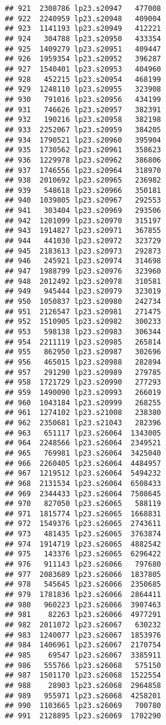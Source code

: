 \documentclass[
]{article}
\begin{document}
\begin{verbatim}
## 921  2308786 lp23.s20947   477008
## 922  2240959 lp23.s20948   409004
## 923  1141193 lp23.s20949   412221
## 924   304788 lp23.s20950   433354
## 925  1409279 lp23.s20951   409447
## 926  1959354 lp23.s20952   396287
## 927  1540401 lp23.s20953   404960
## 928   452215 lp23.s20954   468199
## 929  1248110 lp23.s20955   323908
## 930   791016 lp23.s20956   434199
## 931   746626 lp23.s20957   382391
## 932   190216 lp23.s20958   382198
## 933  2252067 lp23.s20959   384205
## 934  1790521 lp23.s20960   395904
## 935  1730562 lp23.s20961   358623
## 936  1229978 lp23.s20962   386806
## 937  1746556 lp23.s20964   318970
## 938  2010692 lp23.s20965   236982
## 939   548618 lp23.s20966   350181
## 940  1039805 lp23.s20967   292553
## 941   303404 lp23.s20969   293506
## 942  1201099 lp23.s20970   315197
## 943  1914827 lp23.s20971   367855
## 944   441030 lp23.s20972   323729
## 945  2183613 lp23.s20973   292873
## 946   245921 lp23.s20974   314698
## 947  1988799 lp23.s20976   323960
## 948  2012492 lp23.s20978   310581
## 949   945444 lp23.s20979   323019
## 950  1050837 lp23.s20980   242734
## 951  2126547 lp23.s20981   271475
## 952  1510905 lp23.s20982   300233
## 953   598138 lp23.s20983   306344
## 954  2211119 lp23.s20985   265814
## 955   862950 lp23.s20987   302696
## 956   465015 lp23.s20988   282894
## 957   291290 lp23.s20989   279785
## 958  1721729 lp23.s20990   277293
## 959  1490090 lp23.s20993   266019
## 960  1043184 lp23.s20999   268255
## 961  1274102 lp23.s21008   238380
## 962  2350681 lp23.s21043   282396
## 963   651117 lp23.s26064  1343005
## 964  2248566 lp23.s26064  2349521
## 965   769981 lp23.s26064  3425040
## 966  2260405 lp23.s26064  4484957
## 967  1219512 lp23.s26064  5494232
## 968  2131534 lp23.s26064  6508433
## 969  2344433 lp23.s26064  7508645
## 970   827050 lp23.s26065   588119
## 971  1815774 lp23.s26065  1668831
## 972  1549376 lp23.s26065  2743611
## 973   481435 lp23.s26065  3763874
## 974  1914719 lp23.s26065  4882542
## 975   143376 lp23.s26065  6296422
## 976   911143 lp23.s26066   797680
## 977  2083689 lp23.s26066  1837805
## 978   545645 lp23.s26066  2350685
## 979  1781836 lp23.s26066  2864411
## 980   960223 lp23.s26066  3907463
## 981    82263 lp23.s26066  4977291
## 982  2011072 lp23.s26067   630232
## 983  1240077 lp23.s26067  1853976
## 984  1406961 lp23.s26067  2170754
## 985    69547 lp23.s26067  3385911
## 986   555766 lp23.s26068   575150
## 987  1501170 lp23.s26068  1522554
## 988    28903 lp23.s26068  2964858
## 989   955971 lp23.s26068  4258201
## 990  1103665 lp23.s26069   700780
## 991  2128895 lp23.s26069  1702290

\end{verbatim}
\end{document}
